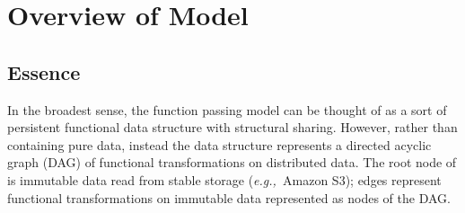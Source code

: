 \documentclass{jfp1}
\newcommand{\eg}{{\em e.g.,~}}
\begin{document}


%
%
%
%
%
%
%

\section{Overview of Model}
\label{sec:basic-model}

\subsection{Essence}

In the broadest sense, the function passing model can be thought of as a sort of
persistent functional data structure with structural sharing. However, rather
than containing pure data, instead the data structure represents a directed
acyclic graph (DAG) of functional transformations on distributed data. The root
node of is immutable data read from stable storage (\eg Amazon S3); edges
represent functional transformations on immutable data represented as nodes of
the DAG.
\end{document}
